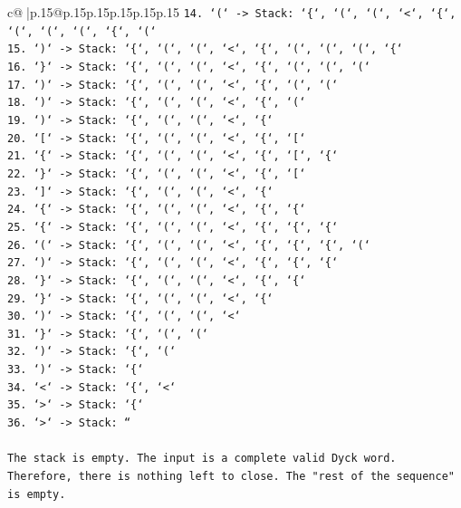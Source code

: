 \documentclass{article}
\begin{document}
{\begin{supertabular}{c@{$\;$}|p{.15\linewidth}@{}p{.15\linewidth}p{.15\linewidth}p{.15\linewidth}p{.15\linewidth}p{.15\linewidth}}
{{{\texttt{14. `(` {-}> Stack: `\{`, `(`, `(`, `<`, `\{`, `(`, `(`, `(`, `\{`, `(`} \\
\texttt{15. `)` {-}> Stack: `\{`, `(`, `(`, `<`, `\{`, `(`, `(`, `(`, `\{`} \\
\texttt{16. `\}` {-}> Stack: `\{`, `(`, `(`, `<`, `\{`, `(`, `(`, `(`} \\
\texttt{17. `)` {-}> Stack: `\{`, `(`, `(`, `<`, `\{`, `(`, `(`} \\
\texttt{18. `)` {-}> Stack: `\{`, `(`, `(`, `<`, `\{`, `(`} \\
\texttt{19. `)` {-}> Stack: `\{`, `(`, `(`, `<`, `\{`} \\
\texttt{20. `{[}` {-}> Stack: `\{`, `(`, `(`, `<`, `\{`, `{[}`} \\
\texttt{21. `\{` {-}> Stack: `\{`, `(`, `(`, `<`, `\{`, `{[}`, `\{`} \\
\texttt{22. `\}` {-}> Stack: `\{`, `(`, `(`, `<`, `\{`, `{[}`} \\
\texttt{23. `{]}` {-}> Stack: `\{`, `(`, `(`, `<`, `\{`} \\
\texttt{24. `\{` {-}> Stack: `\{`, `(`, `(`, `<`, `\{`, `\{`} \\
\texttt{25. `\{` {-}> Stack: `\{`, `(`, `(`, `<`, `\{`, `\{`, `\{`} \\
\texttt{26. `(` {-}> Stack: `\{`, `(`, `(`, `<`, `\{`, `\{`, `\{`, `(`} \\
\texttt{27. `)` {-}> Stack: `\{`, `(`, `(`, `<`, `\{`, `\{`, `\{`} \\
\texttt{28. `\}` {-}> Stack: `\{`, `(`, `(`, `<`, `\{`, `\{`} \\
\texttt{29. `\}` {-}> Stack: `\{`, `(`, `(`, `<`, `\{`} \\
\texttt{30. `)` {-}> Stack: `\{`, `(`, `(`, `<`} \\
\texttt{31. `\}` {-}> Stack: `\{`, `(`, `(`} \\
\texttt{32. `)` {-}> Stack: `\{`, `(`} \\
\texttt{33. `)` {-}> Stack: `\{`} \\
\texttt{34. `<` {-}> Stack: `\{`, `<`} \\
\texttt{35. `>` {-}> Stack: `\{`} \\
\texttt{36. `>` {-}> Stack: ``} \\
\\ 
\texttt{The stack is empty. The input is a complete valid Dyck word.} \\
\texttt{Therefore, there is nothing left to close. The "rest of the sequence" is empty.} \\
\\ 
}}}
\end{supertabular}}
\end{document}
